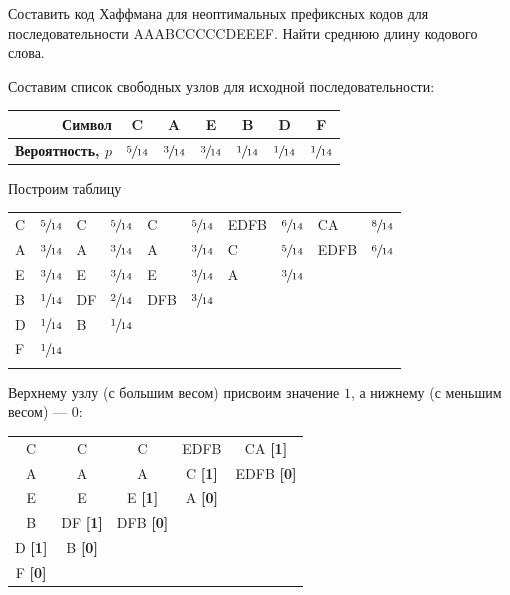 \begin{example}
    \task%
    Составить код Хаффмана для неоптимальных префиксных кодов для последовательности AAABCCCCCDEEEF. Найти среднюю длину кодового слова.

    \solution%
    Составим список свободных узлов для исходной последовательности:
    \begin{table}[H]
        \centering
        \begin{tabular}{|r|c|c|c|c|c|c|}
            \hline
            \textbf{Символ} & C & A & E & B & D & F \\\hline
            \textbf{Вероятность, $p$} & $\sfrac{5}{14}$ & $\sfrac{3}{14}$ & $\sfrac{3}{14}$ & $\sfrac{1}{14}$ & $\sfrac{1}{14}$ & $\sfrac{1}{14}$ \\\hline
        \end{tabular}
    \end{table}

    Построим таблицу

    \begin{table}[H]
        \centering
        \begin{tabular}{|l|c||l|c||l|c||l|c||l|c|}
            \hhline{--||--||--||--||--}
            C & $\sfrac{5}{14}$ & C & $\sfrac{5}{14}$ & C & $\sfrac{5}{14}$ & EDFB & $\sfrac{6}{14}$ & CA & $\sfrac{8}{14}$ \\
            A & $\sfrac{3}{14}$ & A & $\sfrac{3}{14}$ & A & $\sfrac{3}{14}$ & C & $\sfrac{5}{14}$ & EDFB & $\sfrac{6}{14}$ \\
            E & $\sfrac{3}{14}$ & E & $\sfrac{3}{14}$ & E & $\sfrac{3}{14}$ & A & $\sfrac{3}{14}$ & & \\
            B & $\sfrac{1}{14}$ & DF & $\sfrac{2}{14}$ & DFB & $\sfrac{3}{14}$ & & & &\\
            D & $\sfrac{1}{14}$ & B & $\sfrac{1}{14}$ & & & & & &\\
            F & $\sfrac{1}{14}$ & & & & & & & &\\
            \hhline{--||--||--||--||--}
        \end{tabular}
    \end{table}

    Верхнему узлу (с большим весом) присвоим значение $1$, а нижнему (с меньшим весом) --- $0$:

    \begin{table}[H]
        \centering
        \begin{tabular}{|c|c|c|c|c|}
            \hline
            C & C & C & EDFB & CA \textbf{[1]} \\
            A & A & A & C \textbf{[1]} & EDFB \textbf{[0]} \\
            E & E & E \textbf{[1]}   & A \textbf{[0]} & \\
            B & DF \textbf{[1]} & DFB \textbf{[0]} & & \\
            D \textbf{[1]} & B \textbf{[0]} & & & \\
            F \textbf{[0]} & & & & \\
            \hline
        \end{tabular}
    \end{table}


\end{example}
